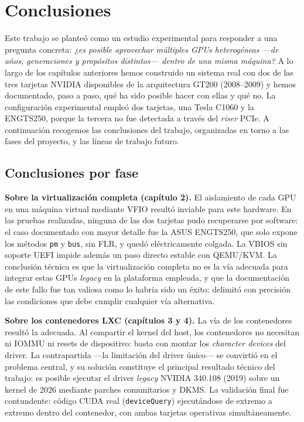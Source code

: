 \chapter*{Conclusiones}

Este trabajo se planteó como un estudio experimental para responder a una pregunta concreta: \emph{¿es posible aprovechar múltiples GPUs heterogéneas ---de años, generaciones y propósitos distintos--- dentro de una misma máquina?} A lo largo de los capítulos anteriores hemos construido un sistema real con dos de las tres tarjetas NVIDIA disponibles de la arquitectura GT200 (2008--2009) y hemos documentado, paso a paso, qué ha sido posible hacer con ellas y qué no. La configuración experimental empleó dos tarjetas, una Tesla C1060 y la ENGTS250, porque la tercera no fue detectada a través del \textit{riser} PCIe. A continuación recogemos las conclusiones del trabajo, organizadas en torno a las fases del proyecto, y las líneas de trabajo futuro.

\section*{Conclusiones por fase}

\textbf{Sobre la virtualización completa (capítulo 2).} El aislamiento de cada GPU en una máquina virtual mediante VFIO resultó inviable para este hardware. En las pruebas realizadas, ninguna de las dos tarjetas pudo recuperarse por software: el caso documentado con mayor detalle fue la ASUS ENGTS250, que solo expone los métodos \texttt{pm} y \texttt{bus}, sin FLR, y quedó eléctricamente colgada. La VBIOS sin soporte UEFI impide además un paso directo estable con QEMU/KVM. La conclusión técnica es que la virtualización completa no es la vía adecuada para integrar estas GPUs \textit{legacy} en la plataforma empleada, y que la documentación de este fallo fue tan valiosa como lo habría sido un éxito: delimitó con precisión las condiciones que debe cumplir cualquier vía alternativa.

\textbf{Sobre los contenedores LXC (capítulos 3 y 4).} La vía de los contenedores resultó la adecuada. Al compartir el kernel del host, los contenedores no necesitan ni IOMMU ni resets de dispositivo: basta con montar los \textit{character devices} del driver. La contrapartida ---la limitación del driver único--- se convirtió en el problema central, y su solución constituye el principal resultado técnico del trabajo: es posible ejecutar el driver \textit{legacy} NVIDIA 340.108 (2019) sobre un kernel de 2026 mediante parches comunitarios y DKMS. La validación final fue contundente: código CUDA real (\texttt{deviceQuery}) ejecutándose de extremo a extremo dentro del contenedor, con ambas tarjetas operativas simultáneamente.

